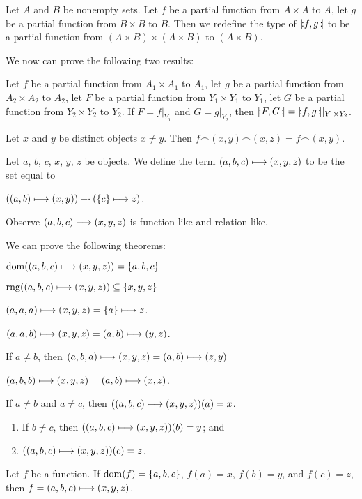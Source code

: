 \documentclass{article}
\begin{document}
\begin{definition}
Let $A$ and $B$ be nonempty sets. Let $f$ be a partial function from
$A\times A$ to $A$, let $g$ be a partial function from $B\times B$ to $B$.
Then we redefine the type of $\mathopen{{|}\!{:}}f,g\,\mathclose{{:}\!{|}}$ to be a partial function
from $(A\times B)\times(A\times B)$ to $(A\times B)$.
\end{definition}

We now can prove the following two results:
\begin{thm}
\item\label{funct4:126} Let $f$ be a partial function from $A_{1}\times A_{1}$
  to $A_{1}$, let $g$ be a partial function from $A_{2}\times A_{2}$ to $A_{2}$,
  let $F$ be a partial function from $Y_{1}\times Y_{1}$ to $Y_{1}$,
  let $G$ be a partial function from $Y_{2}\times Y_{2}$ to $Y_{2}$.
  If $F=f|_{Y_{1}}$ and $G=g|_{Y_{2}}$, then $\mathopen{{|}\!{:}}F,G\,\mathclose{{:}\!{|}}=\mathopen{{|}\!{:}}f,g\,\mathclose{{:}\!{|}}|_{Y_{1}\times Y_{2}}$.
\item\label{funct4:127} Let $x$ and $y$ be distinct objects $x\neq y$.
  Then $f\frown(x,y)\frown(x,z)=f\frown(x,y)$.
\end{thm}

\begin{definition}
Let $a$, $b$, $c$, $x$, $y$, $z$ be objects.
We define the term $(a,b,c)\longmapsto(x,y,z)$ to be the set equal to
\begin{defn}
\item $((a,b)\longmapsto(x,y))\mathbin{\mathord{+}\cdot}(\{c\}\longmapsto z)$.
\end{defn}
\end{definition}
Observe $(a,b,c)\longmapsto(x,y,z)$ is function-like and relation-like.

We can prove the following theorems:
\begin{thm}
\item\label{funct4:128} $\operatorname{dom}((a,b,c)\longmapsto(x,y,z))=\{a,b,c\}$
\item\label{funct4:129} $\operatorname{rng}((a,b,c)\longmapsto(x,y,z))\subseteq\{x,y,z\}$
\item\label{funct4:130} $(a,a,a)\longmapsto(x,y,z)=\{a\}\longmapsto z$.
\item\label{funct4:131} $(a,a,b)\longmapsto(x,y,z)=(a,b)\longmapsto(y,z)$.
\item\label{funct4:132} If $a\neq b$, then
  $(a,b,a)\longmapsto(x,y,z)=(a,b)\longmapsto(z,y)$
\item\label{funct4:133} $(a,b,b)\longmapsto(x,y,z)=(a,b)\longmapsto(x,z)$.
\item\label{funct4:134} If $a\neq b$ and $a\neq c$, then
  $((a,b,c)\longmapsto(x,y,z))(a)=x$.
\item\label{funct4:135} 
  \begin{enumerate}[label=(\roman*)]
  \item If $b\neq c$, then $((a,b,c)\longmapsto(x,y,z))(b)=y$; and
  \item $((a,b,c)\longmapsto(x,y,z))(c)=z$.
  \end{enumerate}
\item\label{funct4:136} Let $f$ be a function. If $\operatorname{dom}(f)=\{a,b,c\}$,
  $f(a)=x$, $f(b)=y$, and $f(c)=z$, then $f = (a,b,c)\longmapsto(x,y,z)$.
\end{thm}
\end{document}
